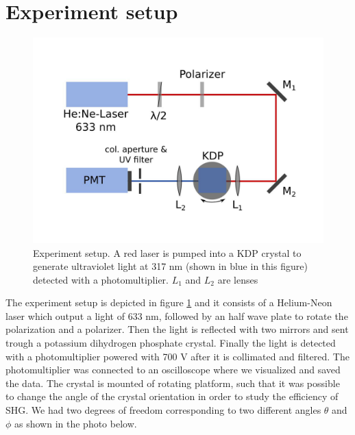 \documentclass[a4paper,10pt]{article}
\begin{document}
\section{Experiment setup}
\begin{figure}[H]
\centering
\includegraphics[width=.6\textwidth]{setup}
\caption{Experiment setup. A red laser is pumped into a KDP crystal to generate ultraviolet light at 317 nm (shown in blue in this figure) detected with a photomultiplier. $L_1$ and $L_2$ are lenses}\label{setup}
\end{figure}
The experiment setup is depicted in figure \ref{setup} and it consists of a Helium-Neon laser which output a light of 633 nm, followed by an half wave plate to rotate the polarization and a polarizer. Then the light is reflected with two mirrors and sent trough a potassium dihydrogen phosphate crystal. Finally the light is detected with a photomultiplier powered with 700 V after it is collimated and filtered. The photomultiplier was connected to an oscilloscope where we visualized and saved the data. The crystal is mounted of rotating platform, such that it was possible to change the angle of the crystal orientation in order to study the efficiency of SHG. We had two degrees of freedom corresponding to two different angles $\theta$ and $\phi$ as shown in the photo below. 
\end{document}
